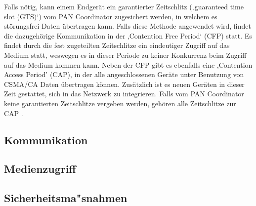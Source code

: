 Falls nötig, kann einem Endgerät ein garantierter Zeitschlitz (‚guaranteed time slot (GTS)‘) vom PAN Coordinator zugesichert werden, in welchem es störungsfrei Daten übertragen kann. Falls diese Methode angewendet wird, findet die dazugehörige Kommunikation in der ‚Contention Free Period‘ (CFP) statt. Es findet durch die fest zugeteilten Zeitschlitze ein eindeutiger Zugriff auf das Medium statt, weswegen es in dieser Periode zu keiner Konkurrenz beim Zugriff auf das Medium kommen kann. Neben der CFP gibt es ebenfalls eine ,Contention Access Period’ (CAP), in der alle angeschlossenen Geräte unter Benutzung von CSMA/CA Daten übertragen können. Zusätzlich ist es neuen Geräten in dieser Zeit gestattet, sich in das Netzwerk zu integrieren. Falls vom PAN Coordinator keine garantierten Zeitschlitze vergeben werden, gehören alle Zeitschlitze zur CAP \cite{d:hesse} \cite{d:ieee}.

\subsection{Kommunikation}\label{ss:Kommunikation}

\subsection{Medienzugriff}\label{ss:Medienzugriff}

\subsection{Sicherheitsma"snahmen}\label{ss:Sicherheitsmassnahmen}